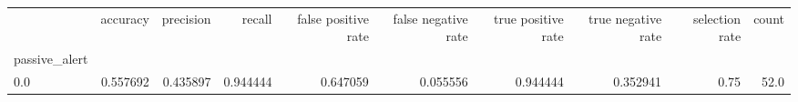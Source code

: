 \begin{tabular}{lrrrrrrrrr}
\toprule
{} &  accuracy &  precision &    recall &  false positive rate &  false negative rate &  true positive rate &  true negative rate &  selection rate &  count \\
passive\_alert &           &            &           &                      &                      &                     &                     &                 &        \\
\midrule
0.0           &  0.557692 &   0.435897 &  0.944444 &             0.647059 &             0.055556 &            0.944444 &            0.352941 &            0.75 &   52.0 \\
\bottomrule
\end{tabular}
